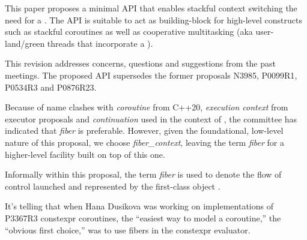 \label{abstract}

This paper proposes a
minimal API that enables stackful context switching  the need for a
. The API is suitable to act as building-block for high-level
constructs such as stackful coroutines as well as cooperative multitasking
(aka user-land/green threads that incorporate a ).

This revision addresses concerns, questions and suggestions from the past meetings.
The proposed API supersedes the former proposals N3985\cite{N3985},
P0099R1\cite{P0099R1}, P0534R3\cite{P0534R3} and P0876R23\cite{P0876R23}.

Because of name clashes with \emph{coroutine} from C++20,
\emph{execution context} from executor proposals and \emph{continuation} used
in the context of , the committee has indicated
that \emph{fiber} is preferable. However, given the foundational, low-level
nature of this proposal, we choose \emph{fiber\_context}, leaving the
term \emph{fiber} for a higher-level facility built on top of this one.

Informally within this proposal, the term \emph{fiber} is used to denote the
flow of control launched and represented by the first-class object \fiber.

It's telling that when Hana Dusikova was working on implementations of P3367R3
constexpr coroutines\cite{P3367R3}, the ``easiest way to model a coroutine,''
the ``obvious first choice,'' was to use fibers in the constexpr evaluator.
